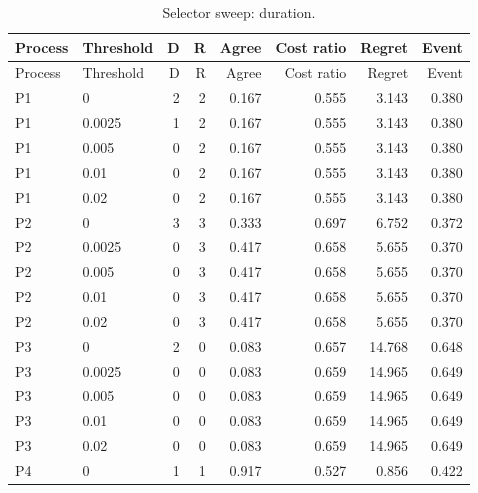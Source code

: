 \begingroup\small\setlength{\tabcolsep}{3pt}\begin{longtable}{llrrrrrr}\caption{Selector sweep: duration.}\\\toprule

Process & Threshold & D & R & Agree & Cost ratio & Regret & Event\\\midrule\endfirsthead

\toprule Process & Threshold & D & R & Agree & Cost ratio & Regret & Event\\\midrule\endhead

P1 & 0 & 2 & 2 & 0.167 & 0.555 & 3.143 & 0.380\\

P1 & 0.0025 & 1 & 2 & 0.167 & 0.555 & 3.143 & 0.380\\

P1 & 0.005 & 0 & 2 & 0.167 & 0.555 & 3.143 & 0.380\\

P1 & 0.01 & 0 & 2 & 0.167 & 0.555 & 3.143 & 0.380\\

P1 & 0.02 & 0 & 2 & 0.167 & 0.555 & 3.143 & 0.380\\

P2 & 0 & 3 & 3 & 0.333 & 0.697 & 6.752 & 0.372\\

P2 & 0.0025 & 0 & 3 & 0.417 & 0.658 & 5.655 & 0.370\\

P2 & 0.005 & 0 & 3 & 0.417 & 0.658 & 5.655 & 0.370\\

P2 & 0.01 & 0 & 3 & 0.417 & 0.658 & 5.655 & 0.370\\

P2 & 0.02 & 0 & 3 & 0.417 & 0.658 & 5.655 & 0.370\\

P3 & 0 & 2 & 0 & 0.083 & 0.657 & 14.768 & 0.648\\

P3 & 0.0025 & 0 & 0 & 0.083 & 0.659 & 14.965 & 0.649\\

P3 & 0.005 & 0 & 0 & 0.083 & 0.659 & 14.965 & 0.649\\

P3 & 0.01 & 0 & 0 & 0.083 & 0.659 & 14.965 & 0.649\\

P3 & 0.02 & 0 & 0 & 0.083 & 0.659 & 14.965 & 0.649\\

P4 & 0 & 1 & 1 & 0.917 & 0.527 & 0.856 & 0.422\\


\end{longtable}
